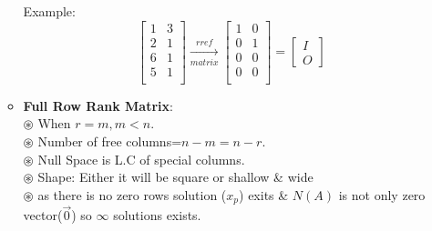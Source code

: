 \documentclass[a4paper,11pt]{article}
\numberwithin{equation}{section}
\begin{document}
\begin{itemize}
\begin{itemize}
    Example:
    \begin{equation}
        \begin{bmatrix}
            1&3\\2&1\\6&1\\5&1\\
        \end{bmatrix} \xrightarrow[matrix]{rref}
        \begin{bmatrix}
            1&0\\0&1\\0&0\\0&0\\
        \end{bmatrix}=
        \begin{bmatrix}
            I\\O
        \end{bmatrix}
    \end{equation}
    \item \textbf{Full Row Rank Matrix}:\\
        \textbf{$\circledast$ }When $r=m,m<n$.\\
        \textbf{$\circledast$ }Number of free columns=$n-m=n-r$.\\
        \textbf{$\circledast$ }Null Space is L.C of special columns.\\
        \textbf{$\circledast$ }Shape: Either it will be square or shallow \& wide\\
        \textbf{$\circledast$ }as there is no zero rows solution ($x_p$) exits \& $N(A)$ is not only zero vector($\vec{0}$) so $\infty$ solutions exists.\\


\end{itemize}
\end{itemize}
\end{document}
